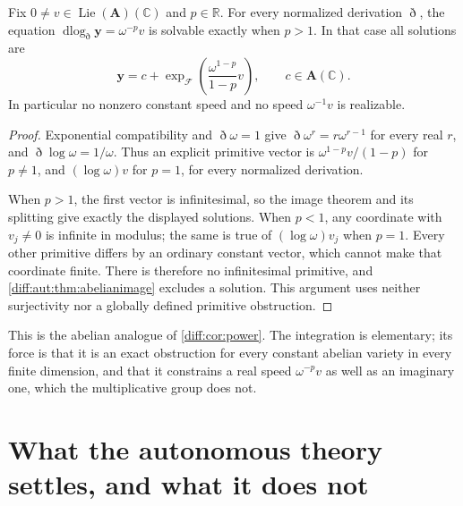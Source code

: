 \documentclass[11pt,letterpaper]{article}
\numberwithin{equation}{section}
\theoremstyle{definition}
\theoremstyle{remark}
\newcommand{\R}{\mathbb R}
\newcommand{\C}{\mathbb C}
\newcommand{\Dn}{\eth}
\newcommand{\Lie}{\operatorname{Lie}}
\newcommand{\dlog}{\operatorname{dlog}}
\begin{document}
\begin{corollary}
\label{diff:aut:cor:speeds}
Fix $0\neq v\in\Lie(\mathbf A)(\C)$ and $p\in\R$.
For every normalized derivation $\Dn$, the equation
$\dlog_{\Dn}\mathbf y=\omega^{-p}v$ is solvable exactly when
$p>1$. In that case all solutions are
\[
 \mathbf y=c+\exp_{\mathcal F}\!\left(
 \frac{\omega^{1-p}}{1-p}v\right),\qquad c\in\mathbf A(\C).
\]
In particular no nonzero constant speed and no speed
$\omega^{-1}v$ is realizable.
\end{corollary}
\begin{proof}
Exponential compatibility and $\Dn\omega=1$ give
$\Dn\omega^r=r\omega^{r-1}$ for every real $r$, and
$\Dn\log\omega=1/\omega$. Thus an explicit primitive vector is
$\omega^{1-p}v/(1-p)$ for $p\neq1$, and $(\log\omega)v$
for $p=1$, for every normalized derivation.

When $p>1$, the first vector is infinitesimal, so the image theorem
and its splitting give exactly the displayed solutions.
When $p<1$, any coordinate with $v_j\neq0$ is infinite in
modulus; the same is true of $(\log\omega)v_j$ when $p=1$.
Every other primitive differs by an ordinary constant vector,
which cannot make that coordinate finite. There is therefore
no infinitesimal primitive, and \cref{diff:aut:thm:abelianimage}
excludes a solution. This argument uses neither surjectivity nor
a globally defined primitive obstruction.
\end{proof}

This is the abelian analogue of \cref{diff:cor:power}. The integration is
elementary; its force is that it is an exact obstruction for every constant
abelian variety in every finite dimension, and that it constrains a real speed
$\omega^{-p}v$ as well as an imaginary one, which the multiplicative group does not.

\section{What the autonomous theory settles, and what it does not}
\label{diff:aut:sec:limits}
\end{document}
